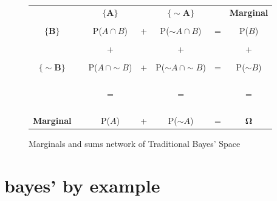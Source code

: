 \documentclass[
  12 pt,
  a4paper,
]{book}
\numberwithin{equation}{section}
\theoremstyle{plain}      %
\theoremstyle{definition} %
\theoremstyle{remark}     %
\theoremstyle{note}         %
\begin{document}
\begin{figure}[htbp]
\centering
\begin{tabular}{ccccccc}
               & & $\mathbf{\{A\}}$               &   & $\mathbf{\{\sim\! A \}}$  &   & \textbf{Marginal}             \\
               & &                       &   &                 &   &                      \\
$\mathbf{\{B\}}$        & & P($A \cap B$)         & + & P($\sim\! A \cap B$) & = & P($B$)          \\
               & &                       &   &                 &   &                      \\
               & & +                     &   & +               &   &       +              \\
               & &                       &   &                 &   &                      \\
$\mathbf{\{\sim\! B \}}$ & & P($A\, \cap \sim\! B$)  & + & P($\sim\! A\, \cap \sim\! B$) & = & P($\sim\! B$)  \\
               & &                         &   &               &   &                      \\
               & & \text{ }\begin{rotate}{90}=\end{rotate}     &   & \text{ }\begin{rotate}{90}=\end{rotate}   &   &  \text{ }\begin{rotate}{90}=\end{rotate}  \\
               & &                       &   &                 &   &                      \\
\textbf{Marginal}       & & P($A$)                & + & P($\sim\! A$)   & = &  $\mathbf{\Omega}$            \\
\end{tabular}
\caption{Marginals and sums network of Traditional Bayes' Space}
\label{fig:m_bayes_space}

\end{figure}

\newpage

\newpage

\hypertarget{bayes-by-example}{%
\section{bayes' by example}\label{bayes-by-example}}
\end{document}
